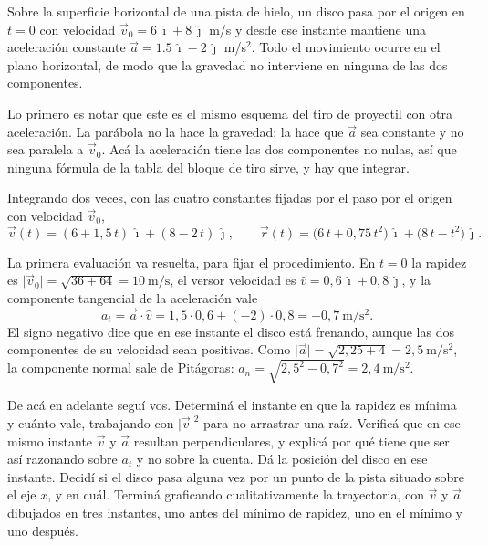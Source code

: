 \documentclass[11pt,openany]{book}
\begin{document}
\begin{ejemplo}[parcial]
Sobre la superficie horizontal de una pista de hielo, un disco pasa por el origen en $t = 0$ con velocidad $\vec v_0 = 6\,\hat\imath + 8\,\hat\jmath$ m/s y desde ese instante mantiene una aceleración constante $\vec a = 1.5\,\hat\imath - 2\,\hat\jmath$ m/s$^2$. Todo el movimiento ocurre en el plano horizontal, de modo que la gravedad no interviene en ninguna de las dos componentes.

Lo primero es notar que este es el mismo esquema del tiro de proyectil con otra aceleración. La parábola no la hace la gravedad: la hace que $\vec a$ sea constante y no sea paralela a $\vec v_0$. Acá la aceleración tiene las dos componentes no nulas, así que ninguna fórmula de la tabla del bloque de tiro sirve, y hay que integrar.

Integrando dos veces, con las cuatro constantes fijadas por el paso por el origen con velocidad $\vec v_0$,
\[
\vec v(t) = (6 + 1{,}5\,t)\,\hat\imath + (8 - 2\,t)\,\hat\jmath,
\qquad
\vec r(t) = \big(6\,t + 0{,}75\,t^2\big)\,\hat\imath + \big(8\,t - t^2\big)\,\hat\jmath.
\]

La primera evaluación va resuelta, para fijar el procedimiento. En $t = 0$ la rapidez es $\lvert\vec v_0\rvert = \sqrt{36+64} = 10\ \mathrm{m/s}$, el versor velocidad es $\hat v = 0{,}6\,\hat\imath + 0{,}8\,\hat\jmath$, y la componente tangencial de la aceleración vale
\[
a_t = \vec a\cdot\hat v = 1{,}5\cdot 0{,}6 + (-2)\cdot 0{,}8 = -0{,}7\ \mathrm{m/s^2}.
\]
El signo negativo dice que en ese instante el disco está frenando, aunque las dos componentes de su velocidad sean positivas. Como $\lvert\vec a\rvert = \sqrt{2{,}25+4} = 2{,}5\ \mathrm{m/s^2}$, la componente normal sale de Pitágoras: $a_n = \sqrt{2{,}5^2 - 0{,}7^2} = 2{,}4\ \mathrm{m/s^2}$.

De acá en adelante seguí vos. Determiná el instante en que la rapidez es mínima y cuánto vale, trabajando con $\lvert\vec v\rvert^2$ para no arrastrar una raíz. Verificá que en ese mismo instante $\vec v$ y $\vec a$ resultan perpendiculares, y explicá por qué tiene que ser así razonando sobre $a_t$ y no sobre la cuenta. Dá la posición del disco en ese instante. Decidí si el disco pasa alguna vez por un punto de la pista situado sobre el eje $x$, y en cuál. Terminá graficando cualitativamente la trayectoria, con $\vec v$ y $\vec a$ dibujados en tres instantes, uno antes del mínimo de rapidez, uno en el mínimo y uno después.
\end{ejemplo}
\end{document}
